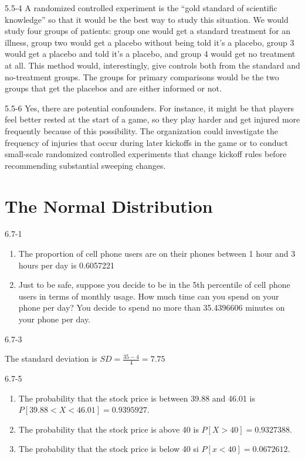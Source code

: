 \begin{exsol@solution}{5.5-4}
A randomized controlled experiment is the ``gold standard of scientific knowledge'' so that it would be the best way to study this situation. We would study four groups of patients: group one would get a standard treatment for an illness, group two would get a placebo without being told it's a placebo, group 3 would get a placebo and told it's a placebo, and group 4 would get no treatment at all. This method would, interestingly, give controls both from the standard and no-treatment groups. The groups for primary comparisons would be the two groups that get the placebos and are either informed or not.

\end{exsol@solution}
\begin{exsol@solution}{5.5-6}
Yes, there are potential confounders. For instance, it might be that players feel better rested at the start of a game, so they play harder and get injured more frequently because of this possibility. The organization could investigate the frequency of injuries that occur during later kickoffs in the game or to conduct small-scale randomized controlled experiments that change kickoff rules before recommending substantial sweeping changes.

\end{exsol@solution}
\setcounter{chapter}{6}\chapter{The Normal Distribution}
\begin{exsol@solution}{6.7-1}

\begin{enumerate}
	\item The proportion of cell phone users are on their phones between 1 hour
and 3 hours per day is 0.6057221
  \item Just to be safe, suppose you decide to be in the 5th percentile of
cell phone users in terms of monthly usage.  How much time can you spend on your phone per day? You decide to spend no more than 35.4396606 minutes on your phone per day.
	\end{enumerate}
\end{exsol@solution}
\begin{exsol@solution}{6.7-3}


    The standard deviation is $SD = \frac{35 - 4}{4} = 7.75$
\end{exsol@solution}
\begin{exsol@solution}{6.7-5}

\begin{enumerate}
\item The probability that the stock price is between 39.88 and 46.01 is $P[39.88 < X < 46.01] = 0.9395927$.
\item The probability that the stock price is above 40 is $P[X > 40] = 0.9327388$.
\item The probability that the stock price is below 40 si $P[ x < 40] = 0.0672612$.
\end{enumerate}
\end{exsol@solution}
